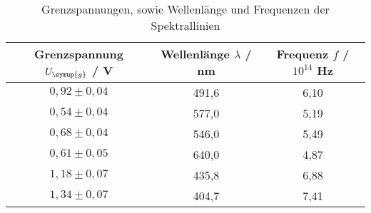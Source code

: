 \begin{table}[!htp]
\centering
\caption{Grenzspannungen, sowie Wellenlänge und Frequenzen der Spektrallinien}
\label{tab:frequenz}
\begin{tabular}{c c c}
\toprule
{Grenzspannung $U_{\symup{g}}$ / V } & {Wellenlänge $\lambda$ / nm} & {Frequenz $f$ / $10^{14}$ Hz} \\
\midrule
$0,92 \pm 0,04$ & 491,6 & 6,10 \\
$0,54 \pm 0,04$ & 577,0 & 5,19 \\
$0,68 \pm 0,04$ & 546,0 & 5,49 \\
$0,61 \pm 0,05$ & 640,0 & 4,87 \\
$1,18 \pm 0,07$ & 435,8 & 6,88 \\
$1,34 \pm 0,07$ & 404,7 & 7,41 \\
\bottomrule
\end{tabular}
\end{table}